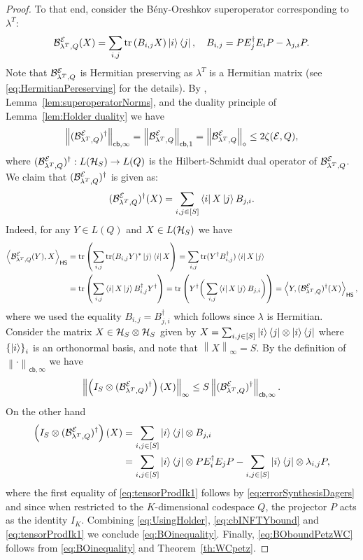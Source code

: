 \documentclass[10pt]{article}
\newcommand{\tr}{\mathrm{tr}}
\newcommand{\p}[1]{\left(#1\right)}
\newcommand{\ppp}[1]{\left\{#1\right\}}
\newcommand{\norm}[1]{\left\|#1\right\|}
\newcommand{\innerP}[1]{\left\langle#1\right\rangle}
\newcommand{\s}[1]{\mathsf{#1}}
\begin{document}
\begin{proof}
    To that end, consider the B\'eny-Oreshkov superoperator corresponding to $ {\lambda^T}$:
    \[\calB^{\calE}_{ {\lambda^T},Q}(X)= \sum_{i,j}\tr\p{B_{i,j}X}\ket{i}\bra{j}, \quad B_{i,j} = P {E_j^\dag E_i}P- {\lambda_{j,i}}P.\]
    Note that ${\cal B}_{ {\lambda^T},Q}^{{\cal E}}$ is Hermitian preserving as $\lambda^T$ is a Hermitian matrix (see \eqref{eq:HermitianPereserving} for the details). By \cite[Remark 8]{Elimelech2026Theory}, Lemma~\ref{lem:superoperatorNorms}, and the duality principle of Lemma~\ref{lem:Holder duality} we have 
    \[\norm{(\calB^{\calE}_{ {\lambda^T},Q})^\dag}_{\s{cb},\infty}=\norm{\calB^{\calE}_{ {\lambda^T},Q}}_{\s{cb},1}=\norm{\calB^{\calE}_{ {\lambda^T},Q}}_{\diamond}\leq 2\zeta(\calE,Q),\]
    where $({\cal B}^{{\cal E}}_{ {\lambda^T},Q})^\dag:L({\cal H}_{S})\to L(Q)$ is the Hilbert-Schmidt dual operator of ${\cal B}^{{\cal E}}_{ {\lambda^T},Q}$. We claim that $({\cal B}^{{\cal E}}_{ {\lambda^T},Q})^\dag$ is given as:
    \[({\cal B}^{{\cal E}}_{ {\lambda^T},Q})^\dag(X)=\sum_{i,j\in[S]}\bra{i}X\ket{j}B_{j,i}.\]
    Indeed, for any $Y\in L(Q)$ and  $X\in L({\cal H}_{S})$ we have
    \begin{align*}
        \innerP{\calB^{\calE}_{ {\lambda^T},Q}(Y),X}_{\s{HS}}&=\tr\p{\sum_{i,j}\tr(B_{i,j}Y)^*\ket{j}\bra{i}X}=\sum_{i,j}\tr(Y^\dag B_{i,j}^\dag )\bra{i}X\ket{j}\\
        &=\tr\p{\sum_{i,j}\bra{i}X\ket{j} B_{i,j}^\dag Y^\dag}=\tr\p{Y^\dag \bigg( \sum_{i,j}\bra{i}X\ket{j} B_{j,i} \bigg)  }=\innerP{Y,(\calB^{\calE}_{ {\lambda^T},Q})^\dag (X)}_{\s{HS}},
    \end{align*}
    where we used the equality $B_{i,j}=B_{j,i}^\dag$ which follows since $\lambda$ is Hermitian. Consider the matrix $X\in {\cal H}_S\otimes {\cal H}_S$ given by $X=\sum_{i,j\in[S]}\ket{i}\bra{j}\otimes  {\ket{i}\bra{j}}$ where $\ppp{\ket{i}}_i$ is an orthonormal basis, and note that $ {\norm{X}_{\infty}=S}$. By the definition of $\norm{\cdot}_{\s{cb},\infty}$ we have 
    \begin{equation}
        \norm{\p{I_S\otimes (\calB_{ {\lambda^T},Q}^{\calE})^\dag}(X)}_{\infty}\leq  {S}\norm{(\calB_{ {\lambda^T},Q}^{\calE})^\dag}_{\s{cb},\infty}.\label{eq:cbINFTYbound}
    \end{equation}
    On the other hand 
    \begin{align}
        \p{I_S\otimes (\calB_{ {\lambda^T},Q}^{\calE})^\dag}(X)&\nonumber=\sum_{i,j\in[S]}\ket{i}\bra{j}\otimes  {B_{j,i}}\\
        &=\sum_{i,j\in[S]}\ket{i}\bra{j}\otimes P {E_i^\dag E_j}P- \sum_{i,j\in[S]}\ket{i}\bra{j}\otimes  {\lambda_{i,j}}P,\label{eq:tensorProdIk1}
    \end{align}
    where the first equality of \eqref{eq:tensorProdIk1} follows by \eqref{eq:errorSynthesisDagers} and since when restricted to the $K$-dimensional codespace $Q$, the projector $P$ acts as the identity $I_K$. Combining \eqref{eq:UsingHolder}, \eqref{eq:cbINFTYbound} and \eqref{eq:tensorProdIk1} we conclude \eqref{eq:BOinequality}. Finally, \eqref{eq:BOboundPetzWC} follows from \eqref{eq:BOinequality} and Theorem~\ref{th:WCpetz}.
\end{proof}
\end{document}
